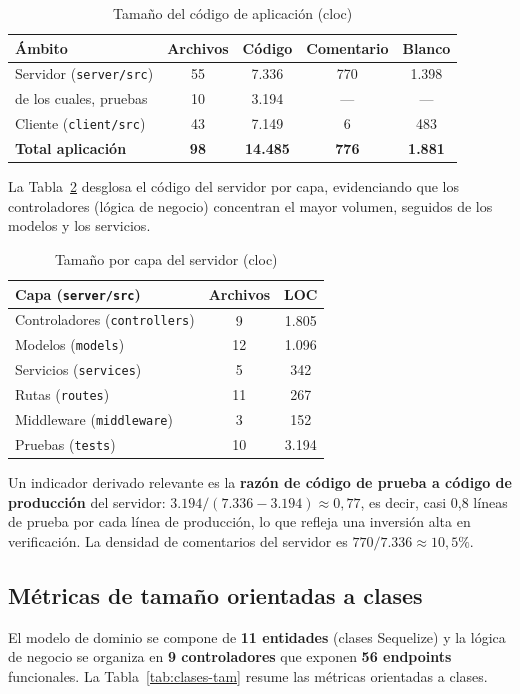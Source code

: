 \begin{table}[H]\centering
\caption{Tamaño del código de aplicación (cloc)}\label{tab:loc-global}
\begin{tabularx}{\textwidth}{X c c c c}
\toprule
\textbf{Ámbito} & \textbf{Archivos} & \textbf{Código} & \textbf{Comentario} & \textbf{Blanco} \\
\midrule
Servidor (\texttt{server/src}) & 55 & 7.336 & 770 & 1.398 \\
\quad de los cuales, pruebas & 10 & 3.194 & --- & --- \\
Cliente (\texttt{client/src}) & 43 & 7.149 & 6 & 483 \\
\textbf{Total aplicación} & \textbf{98} & \textbf{14.485} & \textbf{776} & \textbf{1.881} \\
\bottomrule
\end{tabularx}
\end{table}

La Tabla~\ref{tab:loc-modulos} desglosa el código del servidor por capa, evidenciando
que los controladores (lógica de negocio) concentran el mayor volumen, seguidos de los
modelos y los servicios.

\begin{table}[H]\centering
\caption{Tamaño por capa del servidor (cloc)}\label{tab:loc-modulos}
\begin{tabularx}{\textwidth}{X c c}
\toprule
\textbf{Capa (\texttt{server/src})} & \textbf{Archivos} & \textbf{LOC} \\
\midrule
Controladores (\texttt{controllers}) & 9 & 1.805 \\
Modelos (\texttt{models}) & 12 & 1.096 \\
Servicios (\texttt{services}) & 5 & 342 \\
Rutas (\texttt{routes}) & 11 & 267 \\
Middleware (\texttt{middleware}) & 3 & 152 \\
Pruebas (\texttt{tests}) & 10 & 3.194 \\
\bottomrule
\end{tabularx}
\end{table}

Un indicador derivado relevante es la \textbf{razón de código de prueba a código de
producción} del servidor: $3.194 / (7.336-3.194) \approx 0{,}77$, es decir, casi
0,8 líneas de prueba por cada línea de producción, lo que refleja una inversión alta en
verificación. La densidad de comentarios del servidor es
$770/7.336 \approx 10{,}5\%$.

\subsection{Métricas de tamaño orientadas a clases}
El modelo de dominio se compone de \textbf{11 entidades} (clases Sequelize) y la lógica
de negocio se organiza en \textbf{9 controladores} que exponen \textbf{56 endpoints}
funcionales. La Tabla~\ref{tab:clases-tam} resume las métricas orientadas a clases.

